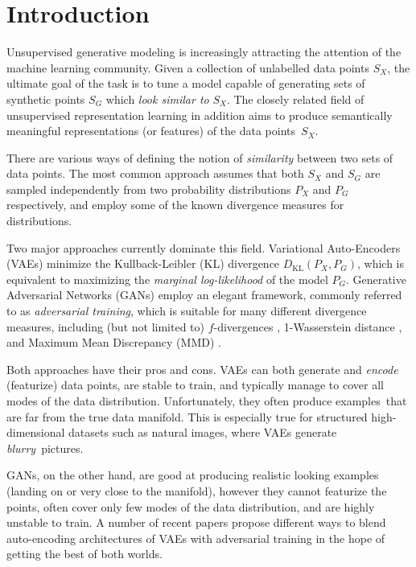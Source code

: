 \documentclass{article}
\def\KL{\mathrm{KL}}
\begin{document}
\section{Introduction}
Unsupervised generative modeling is increasingly attracting the attention of the machine learning community.
Given a collection of unlabelled data points $S_X$, the ultimate goal of the task is to tune a model capable of generating sets of synthetic points $S_G$ which \emph{look similar to} $S_X$.
The closely related field of unsupervised representation learning in addition aims to produce semantically meaningful representations (or features) of the data points~$S_X$.

There are various ways of defining the notion of \emph{similarity} between two sets of data points.
The most common approach assumes that both $S_X$ and $S_G$ are sampled independently from two probability distributions $P_X$ and $P_G$ respectively, and employ some of the known divergence measures for distributions.

Two major approaches currently dominate this field.
Variational Auto-Encoders (VAEs) \cite{KW14} minimize the Kullback-Leibler (KL) divergence $D_{\KL}(P_X, P_G)$, which is equivalent to maximizing the \emph{marginal log-likelihood} of the model $P_G$.
Generative Adversarial Networks (GANs) \cite{goodfellow2014generative} employ an elegant framework, commonly referred to as \emph{adversarial training}, which is suitable for many different divergence measures, including (but not limited to) $f$-divergences \cite{nowozin2016f}, 1-Wasserstein distance \cite{AB17}, and Maximum Mean Discrepancy (MMD) \cite{BS+18}.

Both approaches have their pros and cons. 
VAEs can both generate and \emph{encode} (featurize) data points, are stable to train, and typically manage to cover all modes of the data distribution.
Unfortunately, they often produce examples~that are far from the true data manifold.
This is especially true for structured high-dimensional datasets such as natural images, where VAEs generate \emph{blurry}~pictures.

GANs, on the other hand, are good at producing realistic looking examples (landing on or very close to the manifold), however they cannot featurize the points, often cover only few modes of the data distribution, and are highly unstable to train.
A number of recent papers \cite{MSJ+16, MNG17} propose different ways to blend auto-encoding architectures of VAEs with adversarial training in the hope of getting the best of both worlds.
\end{document}
